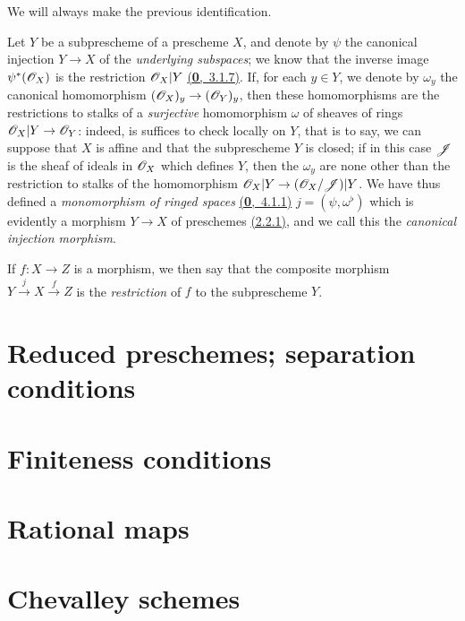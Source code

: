 We will always make the previous identification.
\begin{env}[4.1.7]
\label{env-1.4.1.7}
Let $Y$ be a subprescheme of a prescheme $X$, and denote by $\psi$ the canonical injection
$Y\to X$ of the {\it underlying subspaces}; we know that the inverse image $\psi^*(\mathscr{O}_X)$ is
the restriction $\mathscr{O}_X|Y$ \hyperref[env-0.3.7.1]{(\textbf{0},~3.1.7)}. If, for each $y\in Y$,
we denote by $\omega_y$ the canonical homomorphism $(\mathscr{O}_X)_y\to(\mathscr{O}_Y)_y$, then these
homomorphisms are the restrictions to stalks of a {\it surjective} homomorphism $\omega$
of sheaves of rings $\mathscr{O}_X|Y\to\mathscr{O}_Y$: indeed, is suffices to check locally on $Y$, that is
to say, we can suppose that $X$ is affine and that the subprescheme $Y$ is closed; if in this
case $\mathscr{J}$ is the sheaf of ideals in $\mathscr{O}_X$ which defines $Y$, then the $\omega_y$ are
none other than the restriction to stalks of the homomorphism $\mathscr{O}_X|Y\to(\mathscr{O}_X/\mathscr{J})|Y$.
We have thus defined a
{\it monomorphism of ringed spaces} \hyperref[env-0.4.1.1]{(\textbf{0},~4.1.1)}
$j=(\psi,\omega^\flat)$ which is evidently a morphism $Y\to X$ of
preschemes \hyperref[defn-1.2.2.1]{(2.2.1)}, and we call this the
{\it canonical injection morphism}.

If $f:X\to Z$ is a morphism, we then say that the composite morphism
$Y\xrightarrow{j}X\xrightarrow{f}Z$ is the {\it restriction} of $f$ to the subprescheme $Y$.
\end{env}



\section{Reduced preschemes; separation conditions}
\label{section-reduced-preschemes-and-separation-conditions}

\section{Finiteness conditions}
\label{section-finiteness-conditions}

\section{Rational maps}
\label{section-rational-maps}

\section{Chevalley schemes}
\label{section-chevalley-schemes}

